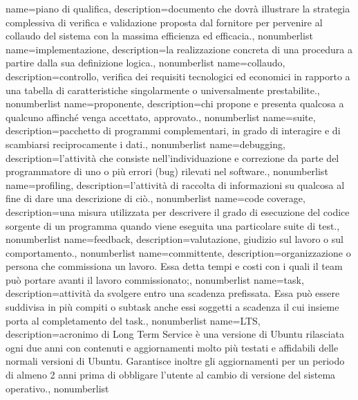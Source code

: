 
\usepackage{glossaries}
\usepackage[utf8x]{inputenc}
\usepackage[italian]{babel}

\makeglossaries
{}
{
	name={piano di qualifica},
	description={documento che dovrà illustrare la strategia complessiva di verifica e validazione proposta dal fornitore per pervenire al collaudo del sistema con la massima efficienza ed efficacia.},
	nonumberlist 
}
{
	name={implementazione},
	description={la realizzazione concreta di una procedura a partire dalla sua definizione logica.},
	nonumberlist 
}
{
	name={collaudo},
	description={controllo, verifica dei requisiti tecnologici ed economici in rapporto a una tabella di caratteristiche singolarmente o universalmente prestabilite.},
	nonumberlist 
}
{
	name={proponente},
	description={chi propone e presenta qualcosa a qualcuno affinché venga accettato, approvato.},
	nonumberlist 
}
{
	name={suite},
	description={pacchetto di programmi complementari, in grado di interagire e di scambiarsi reciprocamente i dati.},
	nonumberlist 
}
{
name={debugging},
description={l'attività che consiste nell'individuazione e correzione da parte del programmatore di uno o più errori (bug) rilevati nel software.},
nonumberlist 
}
{
name={profiling},
description={l'attività di raccolta di informazioni su qualcosa al fine di dare una descrizione di ciò.},
nonumberlist 
}
{
name={code coverage},
description={una misura utilizzata per descrivere il grado di esecuzione del codice sorgente di un programma quando viene eseguita una particolare suite di test.},
nonumberlist 
}
{
name={feedback},
description={valutazione, giudizio sul lavoro o sul comportamento.},
nonumberlist 
}
{
name={committente},
description={organizzazione o persona che commissiona un lavoro. Essa detta tempi e costi con i quali il team può portare avanti il lavoro commissionato;},
nonumberlist 
}
{
name={task},
description={attività da svolgere entro una scadenza prefissata. Essa può essere suddivisa in più compiti o subtask anche essi soggetti a scadenza il cui insieme porta al completamento del task.},
nonumberlist 
}
{
name={LTS},
description={acronimo di Long Term Service è una versione di Ubuntu rilasciata ogni due anni con contenuti e aggiornamenti molto più testati e affidabili delle normali versioni di Ubuntu. Garantisce inoltre gli aggiornamenti per un periodo di almeno 2 anni prima di obbligare l'utente al cambio di versione del sistema operativo.},
nonumberlist 
}
